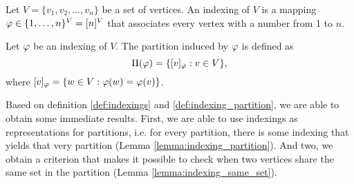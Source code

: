 \begin{definition}
    Let $V = \{ v_1,v_2,\dots, v_n \}$ be a set of vertices. An indexing of $V$ is a mapping $\varphi \in \{ 1,\dots,n \}^V = [n]^V$ that associates every vertex with a number from 1 to $n$. \label{def:indexings}
\end{definition}

\begin{definition}
    Let $\varphi$ be an indexing of $V$. The partition induced by $\varphi$ is defined as
    \begin{equation}
        \Pi(\varphi)= \{ [v]_\varphi : v \in V \}, \label{eq:indexing}
    \end{equation}
    where $[v]_\varphi = \{ w \in V : \varphi(w) = \varphi(v) \}$. \label{def:indexing_partition}
\end{definition}

Based on definition \ref{def:indexings} and \ref{def:indexing_partition}, we are able to obtain some immediate results. First, we are able to use indexings as representations for partitions, i.e. for every partition, there is some indexing that yields that very partition (Lemma \ref{lemma:indexing_partition}). And two, we obtain a criterion that makes it possible to check when two vertices share the same set in the partition (Lemma \ref{lemma:indexing_same_set}).  

